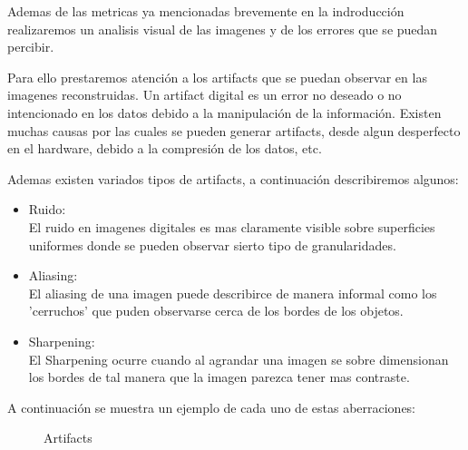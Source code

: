 Ademas de las metricas ya mencionadas brevemente en la indroducción realizaremos un analisis visual de las imagenes y de los errores que se puedan percibir.

Para ello prestaremos atención a los artifacts que se puedan observar en las imagenes reconstruidas. Un artifact digital es un error no deseado o no intencionado en los datos debido a la manipulación de la información. Existen muchas causas por las cuales se pueden generar artifacts, desde algun desperfecto en el hardware, debido a la compresión de los datos, etc.

Ademas existen variados tipos de artifacts, a continuación describiremos algunos:

\begin{itemize}
 \item Ruido:
 \\
 	El ruido en imagenes digitales es mas claramente visible sobre superficies uniformes donde se pueden observar sierto tipo de granularidades.
 \item Aliasing:
 \\
 	El aliasing de una imagen puede describirce de manera informal como los 'cerruchos' que puden observarse cerca de los bordes de los objetos.
 \item Sharpening:
 \\
 El Sharpening ocurre cuando al agrandar una imagen se sobre dimensionan los bordes de tal manera que la imagen parezca tener mas contraste.
\end{itemize}
A continuación se muestra un ejemplo de cada uno de estas aberraciones:
\begin{figure}[H]
\centering
{}
\qquad
{}
\qquad
{}
\caption{Artifacts}
\end{figure}

